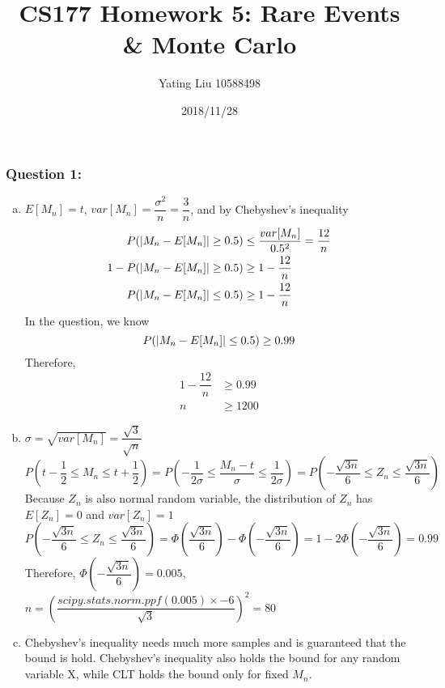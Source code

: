 \documentclass[12pt]{article}
\title{CS177 Homework 5: Rare Events \& Monte Carlo}
\author{Yating Liu 10588498}
\date{2018/11/28}
\begin{document}
\maketitle

\noindent

\subsubsection*{Question 1:} 
\begin{enumerate}[a)]
  \item 
  $E[M_n]=t$, $var[M_n]=\dfrac{\sigma^2}{n}=\dfrac{3}{n}$, and by Chebyshev’s inequality
  \begin{align*}
  P(\abs{M_n-E[M_n]} \geq 0.5) &\leq \dfrac{var[M_n]}{0.5^2} = \dfrac{12}{n}\\
  1-P(\abs{M_n-E[M_n]} \geq 0.5) &\geq 1-\dfrac{12}{n}\\
  P(\abs{M_n-E[M_n]} \leq 0.5) &\geq 1-\dfrac{12}{n}
  \end{align*}
  In the question, we know 
  \begin{equation*}
  P(\abs{M_n-E[M_n]} \leq 0.5) \geq 0.99
  \end{equation*}
  Therefore,
  \begin{align*}
  1-\dfrac{12}{n} &\geq 0.99\\
  n &\geq 1200 
  \end{align*}
  
  \item 
  $\sigma = \sqrt{var[M_n]}=\dfrac{\sqrt{3}}{\sqrt{n}}$
  \begin{equation*}
  P\left(t-\dfrac{1}{2} \leq M_n \leq t+\dfrac{1}{2}\right)=P\left(-\dfrac{1}{2\sigma} \leq \dfrac{M_n-t}{\sigma} \leq \dfrac{1}{2\sigma}\right)=P\left(-\dfrac{\sqrt{3n}}{6} \leq Z_n \leq \dfrac{\sqrt{3n}}{6}\right)
  \end{equation*}
  Because $Z_n$ is also normal random variable, the distribution of $Z_n$ has $E[Z_n]=0$ and $var[Z_n]=1$ 
  \begin{equation*}
  P\left(-\dfrac{\sqrt{3n}}{6} \leq Z_n \leq \dfrac{\sqrt{3n}}{6}\right)=\Phi\left({\dfrac{\sqrt{3n}}{6}}\right)- \Phi\left({-\dfrac{\sqrt{3n}}{6}}\right)=1-2\Phi\left({-\dfrac{\sqrt{3n}}{6}}\right)=0.99
  \end{equation*}
  Therefore, $\Phi\left({-\dfrac{\sqrt{3n}}{6}}\right)=0.005$, $n=\left(\dfrac{scipy.stats.norm.ppf(0.005) \times -6}{\sqrt{3}}\right)^2 =80$
  \item
  Chebyshev’s inequality needs much more samples and is guaranteed that the bound is hold. Chebyshev’s inequality also holds the bound for any random variable X, while CLT holds the bound only for fixed $M_n$.
  

 
\end{enumerate}
\end{document}
